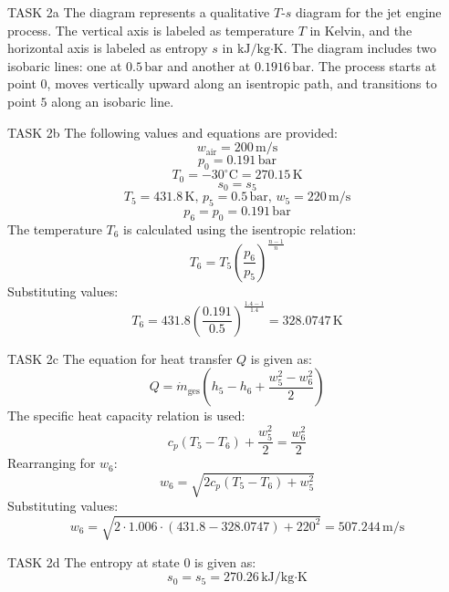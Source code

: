 TASK 2a  
The diagram represents a qualitative \( T \)-\( s \) diagram for the jet engine process. The vertical axis is labeled as temperature \( T \) in Kelvin, and the horizontal axis is labeled as entropy \( s \) in \( \text{kJ}/\text{kg·K} \). The diagram includes two isobaric lines: one at \( 0.5 \, \text{bar} \) and another at \( 0.1916 \, \text{bar} \). The process starts at point \( 0 \), moves vertically upward along an isentropic path, and transitions to point \( 5 \) along an isobaric line.  

TASK 2b  
The following values and equations are provided:  
\[
w_{\text{air}} = 200 \, \text{m/s}
\]
\[
p_0 = 0.191 \, \text{bar}
\]
\[
T_0 = -30^\circ\text{C} = 270.15 \, \text{K}
\]
\[
s_0 = s_5
\]
\[
T_5 = 431.8 \, \text{K}, \, p_5 = 0.5 \, \text{bar}, \, w_5 = 220 \, \text{m/s}
\]
\[
p_6 = p_0 = 0.191 \, \text{bar}
\]
The temperature \( T_6 \) is calculated using the isentropic relation:  
\[
T_6 = T_5 \left( \frac{p_6}{p_5} \right)^{\frac{n-1}{n}}
\]
Substituting values:  
\[
T_6 = 431.8 \left( \frac{0.191}{0.5} \right)^{\frac{1.4-1}{1.4}} = 328.0747 \, \text{K}
\]

TASK 2c  
The equation for heat transfer \( Q \) is given as:  
\[
Q = \dot{m}_{\text{ges}} \left( h_5 - h_6 + \frac{w_5^2 - w_6^2}{2} \right)
\]
The specific heat capacity relation is used:  
\[
c_p (T_5 - T_6) + \frac{w_5^2}{2} = \frac{w_6^2}{2}
\]
Rearranging for \( w_6 \):  
\[
w_6 = \sqrt{2 c_p (T_5 - T_6) + w_5^2}
\]
Substituting values:  
\[
w_6 = \sqrt{2 \cdot 1.006 \cdot (431.8 - 328.0747) + 220^2} = 507.244 \, \text{m/s}
\]

TASK 2d  
The entropy at state \( 0 \) is given as:  
\[
s_0 = s_5 = 270.26 \, \text{kJ}/\text{kg·K}
\]